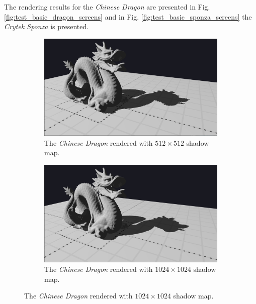 The rendering results for the \textit{Chinese Dragon} are presented in Fig. \ref{fig:test_basic_dragon_screens} and in Fig. \ref{fig:test_basic_sponza_screens} the \textit{Crytek Sponza} is presented.
\begin{figure}
    \centering
    \begin{subfigure}{0.48\textwidth}
		\centering
        \includegraphics[width=\textwidth]{./graf/tests/basic/cropped/dragon_basic_fhd_512.png}
        \caption{The \textit{Chinese Dragon} rendered with \(512\times 512\) shadow map.}
    \end{subfigure}
	\hfill
    \begin{subfigure}{0.48\textwidth}
		\centering
        \includegraphics[width=\textwidth]{./graf/tests/basic/cropped/dragon_basic_fhd_1024.png}
        \caption{The \textit{Chinese Dragon} rendered with \(1024\times 1024\) shadow map.}
    \end{subfigure}


\end{figure}
